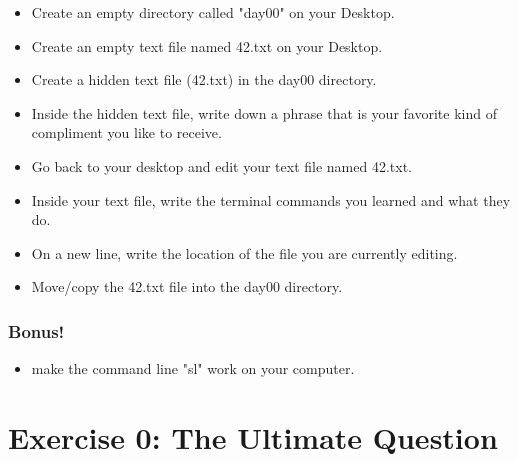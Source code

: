 \documentclass{42-en}
\begin{document}
\begin{itemize}

	\item Create an empty directory called "day00" on your Desktop.
	\item Create an empty text file named 42.txt on your Desktop.
	\item Create a hidden text file (42.txt) in the day00 directory.
	\item Inside the hidden text file, write down a phrase that is your favorite kind of compliment you like to receive.
	\item Go back to your desktop and edit your text file named 42.txt.
	\item Inside your text file, write the terminal commands you learned and what they do.
	\item On a new line, write the location of the file you are currently editing.
	\item Move/copy the 42.txt file into the day00 directory.
\end{itemize}


\subsection{Bonus!}
\begin{itemize}

	\item make the command line "sl" work on your computer.

\end{itemize}


\startexercices

\chapter{Exercise 0: The Ultimate Question}

\makeheaderfiles
\end{document}
